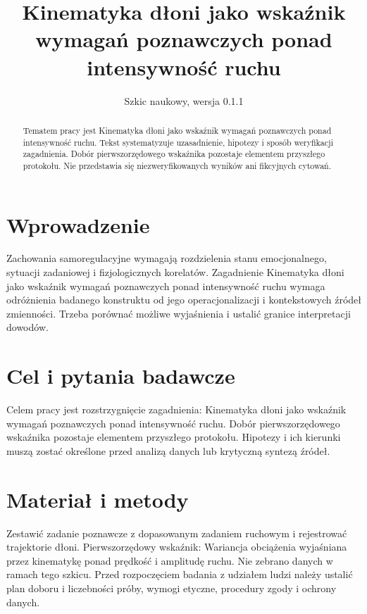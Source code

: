 \documentclass[11pt,a4paper]{article}
\title{Kinematyka dłoni jako wskaźnik wymagań poznawczych ponad intensywność ruchu}
\author{}
\date{Szkic naukowy, wersja 0.1.1}
\begin{document}
\maketitle

\begin{abstract}

Tematem pracy jest Kinematyka dłoni jako wskaźnik wymagań poznawczych ponad intensywność ruchu. Tekst systematyzuje uzasadnienie, hipotezy i sposób weryfikacji zagadnienia. Dobór pierwszorzędowego wskaźnika pozostaje elementem przyszłego protokołu. Nie przedstawia się niezweryfikowanych wyników ani fikcyjnych cytowań.

\end{abstract}

\section{Wprowadzenie}

Zachowania samoregulacyjne wymagają rozdzielenia stanu emocjonalnego, sytuacji zadaniowej i fizjologicznych korelatów. Zagadnienie Kinematyka dłoni jako wskaźnik wymagań poznawczych ponad intensywność ruchu wymaga odróżnienia badanego konstruktu od jego operacjonalizacji i kontekstowych źródeł zmienności. Trzeba porównać możliwe wyjaśnienia i ustalić granice interpretacji dowodów.

\section{Cel i pytania badawcze}

Celem pracy jest rozstrzygnięcie zagadnienia: Kinematyka dłoni jako wskaźnik wymagań poznawczych ponad intensywność ruchu. Dobór pierwszorzędowego wskaźnika pozostaje elementem przyszłego protokołu. Hipotezy i ich kierunki muszą zostać określone przed analizą danych lub krytyczną syntezą źródeł.

\section{Materiał i metody}

Zestawić zadanie poznawcze z dopasowanym zadaniem ruchowym i rejestrować trajektorie dłoni. Pierwszorzędowy wskaźnik: Wariancja obciążenia wyjaśniana przez kinematykę ponad prędkość i amplitudę ruchu. Nie zebrano danych w ramach tego szkicu. Przed rozpoczęciem badania z udziałem ludzi należy ustalić plan doboru i liczebności próby, wymogi etyczne, procedury zgody i ochrony danych.
\end{document}
